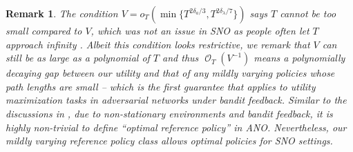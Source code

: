 \documentclass[11pt,fullpage,letterpaper]{article} %
\newtheorem{remark}{Remark}
\renewcommand{\O}{\operatorname{\mathcal O}}
\begin{document}
\begin{remark}\label{remark:utility main theorem}
The condition $V=o_T(\min\{T^{2\delta_a/3},T^{2\delta_\lambda/7}\})$ says $T$ cannot be too small compared to $V$, which was not an issue in SNO as people often let $T$ approach infinity \citep{neely2008fairness}.
Albeit this condition looks restrictive, we remark that $V$ can still be as large as a polynomial of $T$ and thus $\O_T(V^{-1})$ means a polynomially decaying gap between our utility and that of any mildly varying policies whose path lengths are small -- which is the first guarantee that applies to utility maximization tasks in adversarial networks under bandit feedback. 
Similar to the discussions in , due to non-stationary environments and bandit feedback, it is highly non-trivial to define ``optimal reference policy'' in ANO. Nevertheless, our mildly varying reference policy class allows optimal policies for SNO settings.
\end{remark}
\end{document}
